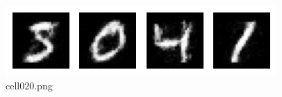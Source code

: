 \begin{figure}[ht]
	\centering
	\includegraphics[scale=0.8, max width=\linewidth]{./fig/energy-based-model/boltzmann-machine/cell020.png}
	\caption{cell020.png}
	\label{cell020.png}
\end{figure}